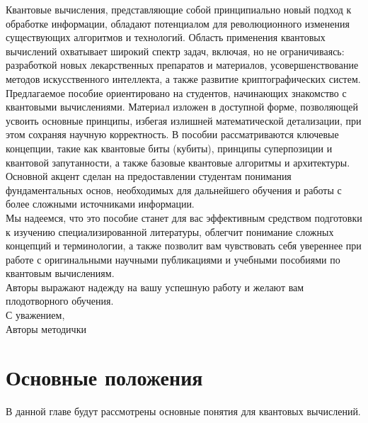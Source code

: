 \documentclass[12pt,a4paper]{article}
\begin{document}
	Квантовые вычисления, представляющие собой принципиально новый подход к обработке информации, обладают потенциалом для революционного изменения существующих алгоритмов и технологий. Область применения квантовых вычислений охватывает широкий спектр задач, включая, но не ограничиваясь: разработкой новых лекарственных препаратов и материалов, усовершенствование методов искусственного интеллекта, а также развитие криптографических систем.\\
	
	Предлагаемое пособие ориентировано на студентов, начинающих знакомство с квантовыми вычислениями. Материал изложен в доступной форме, позволяющей усвоить основные принципы, избегая излишней математической детализации, при этом сохраняя научную корректность. В пособии рассматриваются ключевые концепции, такие как квантовые биты (кубиты), принципы суперпозиции и квантовой запутанности, а также базовые квантовые алгоритмы и архитектуры. Основной акцент сделан на предоставлении студентам понимания фундаментальных основ, необходимых для дальнейшего обучения и работы с более сложными источниками информации.\\
	
	Мы надеемся, что это пособие станет для вас эффективным средством подготовки к изучению специализированной литературы, облегчит понимание сложных концепций и терминологии, а также позволит вам чувствовать себя увереннее при работе с оригинальными научными публикациями и учебными пособиями по квантовым вычислениям.\\
	
	
	Авторы выражают надежду на вашу успешную работу и желают вам плодотворного обучения.\\
	
	С уважением,\\ Авторы методички\\
	
	\newpage
	\section{Основные положения}
	В данной главе будут рассмотрены основные понятия для квантовых вычислений.
\end{document}
